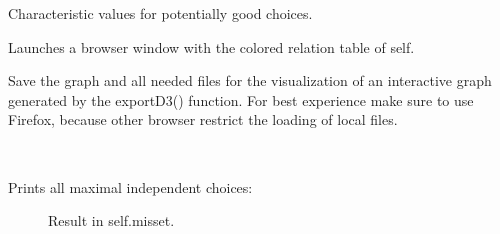 \documentclass[letterpaper,10pt,english]{sphinxmanual}
\begin{document}
\begin{fulllineitems}

\begin{fulllineitems}
\label{techDoc:digraphs.Digraph.showComponents}
\end{fulllineitems}


\begin{fulllineitems}
\label{techDoc:digraphs.Digraph.showGoodChoices}
Characteristic values for potentially good choices.

\end{fulllineitems}


\begin{fulllineitems}
\label{techDoc:digraphs.Digraph.showHTMLRelationTable}
Launches a browser window with the colored relation table of self.

\end{fulllineitems}


\begin{fulllineitems}
\label{techDoc:digraphs.Digraph.showInteractiveGraph}
Save the graph and all needed files for the visualization of an interactive graph generated by the exportD3() function.
For best experience make sure to use Firefox, because other browser restrict the loading of local files.

\end{fulllineitems}


\begin{fulllineitems}
\label{techDoc:digraphs.Digraph.showMIS}~\begin{description}
\item[{Prints all maximal independent choices:}] \leavevmode
Result in self.misset.

\end{description}

\end{fulllineitems}


\end{fulllineitems}
\end{document}
